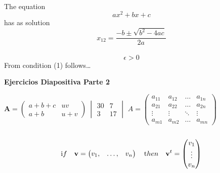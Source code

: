 \documentclass{article}
\begin{document}
\\
The equation
$$ax^{2} + bx + c$$
has as solution
$$x_{12} = \frac{-b\pm\sqrt{b^{2} - 4ac}}{2a}$$ \\
\begin{equation}
\epsilon > 0
\end{equation}
From condition (1) follows\ldots \\
\begin{center}
\textbf{Ejercicios Diapositiva Parte 2}
\end{center}
$\textbf{A} = \begin{pmatrix}
a+b+c & uv\\
a+b & u+v
\end{pmatrix}\
\begin{vmatrix}
30 & 7\\
3 & 17
\end{vmatrix}$
\qquad
\qquad
\qquad
$A = \begin{pmatrix}
a_{11} & a_{12} & \ldots & a_{1n}\\
a_{21} & a_{22} & \ldots & a_{2n}\\
\vdots & \vdots & \ddots & \vdots\\
a_{m1} & a_{m2} & \ldots & a_{mn}
\end{pmatrix}$ \\
\\
\[\begin{text}
if
\end{text}
\quad
\begin{textbf}
v
\end{textbf}
 = \begin{pmatrix}
v_{1}, & \ldots, & v_{n} 
\end{pmatrix}
\quad
\begin{text}
then
\end{text}
\quad
\begin{textbf}
v^{t}
\end{textbf}
= \begin{pmatrix}
v_1\\
\vdots\\
v_n
\end{pmatrix}\]
\end{document}
